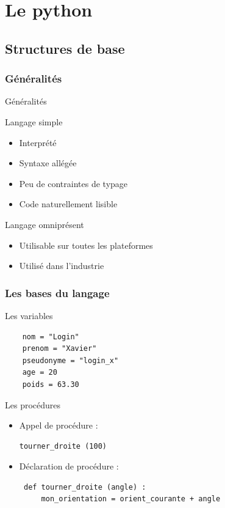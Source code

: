 \documentclass{beamer}
\begin{document}
\section{Le python}
\subsection{Structures de base}
\subsubsection{Généralités}
\begin{frame}{Généralités}
\begin{block}{Langage simple}
    \begin{itemize}
        \item Interprété
        \item Syntaxe allégée
        \item Peu de contraintes de typage
        \item Code naturellement lisible
    \end{itemize}
\end{block}
\begin{block}{Langage omniprésent}
    \begin{itemize}
        \item Utilisable sur toutes les plateformes
        \item Utilisé dans l’industrie
    \end{itemize}
\end{block}
\end{frame}

\subsubsection{Les bases du langage}
\begin{frame}[fragile]{Les variables}
\begin{lstlisting}
    nom = "Login"
    prenom = "Xavier"
    pseudonyme = "login_x"
    age = 20
    poids = 63.30
\end{lstlisting}
\end{frame}

\begin{frame}[fragile]{Les procédures}
\begin{itemize}
\item Appel de procédure :\\
\begin{lstlisting}
tourner_droite (100)
\end{lstlisting}
\item Déclaration de procédure :\\
\begin{lstlisting}
 def tourner_droite (angle) :
     mon_orientation = orient_courante + angle
\end{lstlisting}
\end{itemize}
\end{frame}
\end{document}
